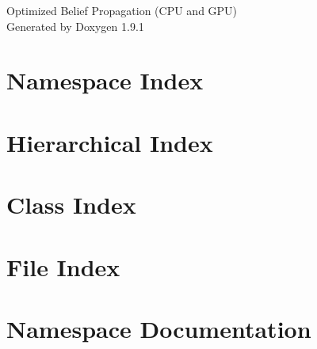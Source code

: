 \let\mypdfximage\pdfximage\def\pdfximage{\immediate\mypdfximage}\documentclass[twoside]{book}
\newcommand{\+}{\discretionary{\mbox{\scriptsize$\hookleftarrow$}}{}{}}
\newcommand{\clearemptydoublepage}{%
  \newpage{\pagestyle{empty}\cleardoublepage}%
}
\begin{document}
\raggedbottom

\hypersetup{pageanchor=false,
             bookmarksnumbered=true,
             pdfencoding=unicode
            }
\begin{titlepage}
\vspace*{7cm}
\begin{center}%
{\Large Optimized Belief Propagation (CPU and GPU) }\\
\vspace*{1cm}
{\large Generated by Doxygen 1.9.1}\\
\end{center}
\end{titlepage}
\clearemptydoublepage
{}
\tableofcontents
\clearemptydoublepage
{}
\hypersetup{pageanchor=true}

\chapter{Namespace Index}

\chapter{Hierarchical Index}

\chapter{Class Index}

\chapter{File Index}

\chapter{Namespace Documentation}












\end{document}
